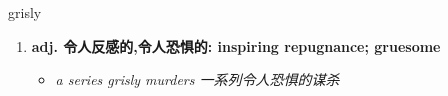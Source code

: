 
\begin{frame}
{\huge grisly}
\begin{center}
\begin{enumerate}\Large
  \item \textbf{adj. 令人反感的,令人恐惧的: inspiring repugnance; gruesome}
  \begin{itemize}
    \item \em{\Large{a series grisly murders 一系列令人恐惧的谋杀}}
  \end{itemize}
\end{enumerate}
\end{center}
\end{frame}
